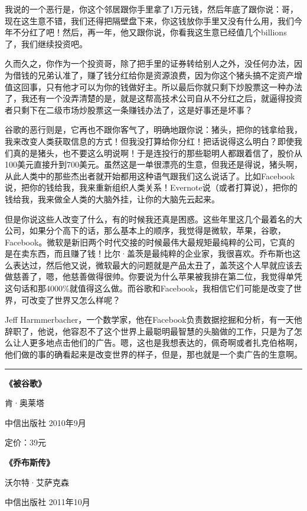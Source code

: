 我说的一个恶行是，你这个邻居跟你手里拿了1万元钱，然后年底了跟你说：哥，现在这生意不错，我们还得把隔壁盘下来，你这钱放你手里又没有什么用，我们今年不分红了吧！然后，再一年，他又跟你说，你看我这生意已经值几个billions了，我们继续投资吧。

久而久之，你作为一个投资哥，除了把手里的证券转给别人之外，没任何办法，因为借钱的兄弟认准了，赚了钱分红给你是资源浪费，因为你这个猪头搞不定资产增值这回事，只有他才可以为你的钱做好主。所以最后你就只剩下炒股票这一种办法了，我还有一个没弄清楚的是，就是这帮高技术公司自从不分红之后，就逼得投资者只剩下在二级市场炒股票这一条赚钱办法了，这是好事还是坏事？

谷歌的恶行则是，它再也不跟你客气了，明确地跟你说：猪头，把你的钱拿给我，我来改变人类获取信息的方式！但我没打算给你分红！把话说得这么明白？即使我们真的是猪头，也不要这么明说啊！于是连投行的那些聪明人都跟着信了，股价从100美元直接升到700美元。虽然这是一单很漂亮的生意，但我还是得说，猪头啊，从此人类中的那些杰出者就开始都用这种语气跟我们这么说话了。比如Facebook说，把你的钱给我，我来重新组织人类关系！Evernote说（或者打算说），把你的钱给我，我来做全人类的大脑外挂，让你的大脑先云起来。

但是你说这些人改变了什么，有的时候我还真是困惑。这些年里这几个最着名的大公司，如果分个高下的话，那么基本上的顺序，我觉得是微软，苹果，谷歌，Facebook。微软是新旧两个时代交接的时候最伟大最规矩最纯粹的公司，它真的是在卖东西，而且赚了钱！比尔·盖茨是最纯粹的企业家，我很喜欢。乔布斯也这么表达过，然后他又说，微软最大的问题就是产品太丑了，盖茨这个人早就应该去做慈善了，嗯，他慈善做得很帅。你要说为什么苹果被我排在第二位，我觉得单凭这句话和那4000\%就值得这么做。而谷歌和Facebook，我相信它们可能是改变了世界，可改变了世界又怎么样呢？

Jeff
Harmmerbacher，一个数学家，他在Facebook负责数据挖掘和分析，有一天他辞职了，他说，他容忍不了这个世界上最聪明最智慧的头脑做的工作，只是为了怎么让人更多地点击他们的广告。嗯，这也是我想表达的，佩奇啊或者扎克伯格啊，他们做的事的确看起来是改变世界的样子，但是，那也就是一个卖广告的生意啊。

\begin{center}\rule{3in}{0.4pt}\end{center}

\textbf{《被谷歌》}

肯·奥莱塔

中信出版社 2010年9月

定价：39元

\textbf{《乔布斯传》}

沃尔特·艾萨克森

中信出版社 2011年10月

